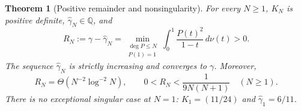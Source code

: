 \documentclass[11pt,a4paper]{article}
\newcommand{\Q}{\mathbb Q}
\newtheorem{theorem}{Theorem}[section]
\theoremstyle{definition}
\theoremstyle{remark}
\numberwithin{equation}{section}
\begin{document}
\begin{theorem}[Positive remainder and nonsingularity]\label{pm:ht:positive}
For every $N\geq1$, $K_N$ is positive definite, $\widehat\gamma_N\in\Q$, and
\begin{equation}\label{pm:ht:variational}
 R_N:=\gamma-\widehat\gamma_N
 =\min_{\substack{\deg P\leq N\\P(1)=1}}
     \int_0^1\frac{P(t)^2}{1-t}\,d\nu(t)>0.
\end{equation}
The sequence $\widehat\gamma_N$ is strictly increasing and converges to $\gamma$.
Moreover,
\begin{equation}\label{pm:ht:error-sharp}
 R_N=\Theta(N^{-2}\log^{-2}N),\qquad
 0<R_N<\frac1{9N(N+1)}\quad(N\geq1).
\end{equation}
There is no exceptional singular case at $N=1$: $K_1=(11/24)$ and
$\widehat\gamma_1=6/11$.
\end{theorem}
\end{document}
